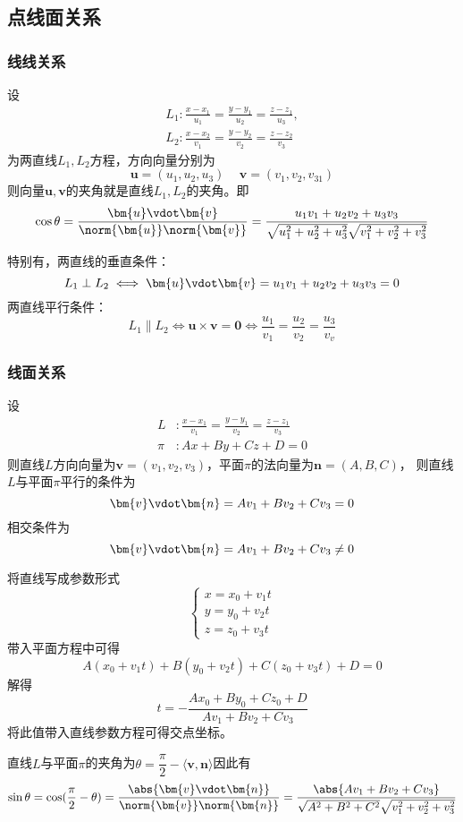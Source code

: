 \subsection{点线面关系}
\subsubsection{线线关系}
设
\begin{align*}
    L_1 : \frac{x-x_1}{u_1} = \frac{y-y_1}{u_2} = \frac{z-z_1}{u_3}, \\
    L_2 : \frac{x-x_2}{v_1} = \frac{y-y_2}{v_2} = \frac{z-z_2}{v_3}
\end{align*}
为两直线$L_1,L_2$方程，方向向量分别为
\[ \bm{u}=(u_1,u_2,u_3)\,\quad\bm{v}=(v_1,v_2,v_31) \]
则向量$\bm{u},\bm{v}$的夹角就是直线$L_1,L_2$的夹角。即
\[
    \cos\theta
    = \frac{\bm{u}\vdot\bm{v}}{\norm{\bm{u}} \norm{\bm{v}}}
    = \frac{u_1v_1 + u_2v_2 + u_3v_3}{\sqrt{u_1^2+u_2^2+u_3^2}\sqrt{v_1^2+v_2^2+v_3^2}}
\]

特别有，两直线的垂直条件：
\[ L_1 \perp L_2 \iff \bm{u}\vdot\bm{v} = u_1v_1 + u_2v_2 + u_3v_3 = 0 \]
两直线平行条件：
\[ L_1 \parallel L_2 \iff \bm{u}\times\bm{v} = \bm{0} \iff \frac{u_1}{v_1} = \frac{u_2}{v_2} = \frac{u_3}{v_v}  \]

\subsubsection{线面关系}
设
\begin{align*}
    L   & : \frac{x-x_1}{v_1} = \frac{y-y_1}{v_2} = \frac{z-z_1}{v_3} \\
    \pi & : Ax+By+Cz+D=0
\end{align*}
则直线$L$方向向量为$\bm{v}=(v_1,v_2,v_3)$，平面$\pi$的法向量为$\bm{n}=(A,B,C)$，
则直线$L$与平面$\pi$平行的条件为
\[ \bm{v}\vdot\bm{n} = Av_1 + Bv_2 + Cv_3 = 0 \]
相交条件为
\[ \bm{v}\vdot\bm{n} = Av_1 + Bv_2 + Cv_3 \neq 0 \]

将直线写成参数形式
\[
    \begin{cases}
        x = x_0 + v_1t \\
        y = y_0 + v_2t \\
        z = z_0 + v_3t
    \end{cases}
\]
带入平面方程中可得
\[ A(x_0 + v_1t)+B(y_0 + v_2t)+C(z_0 + v_3t)+D=0 \]
解得
\[ t = -\frac{Ax_0+By_0+Cz_0+D}{Av_1 + Bv_2 + Cv_3} \]
将此值带入直线参数方程可得交点坐标。

直线$L$与平面$\pi$的夹角为$\theta = \dfrac{\pi}{2} - \langle\bm{v},\bm{n}\rangle$因此有
\[
    \sin\theta = \cos(\frac{\pi}{2}-\theta)
    = \frac{\abs{\bm{v}\vdot\bm{n}}}{\norm{\bm{v}}\norm{\bm{n}}}
    = \frac{\abs{Av_1 + Bv_2 + Cv_3}}{\sqrt{A^2+B^2+C^2}\sqrt{v_1^2+v_2^2+v_3^2}}
\]


